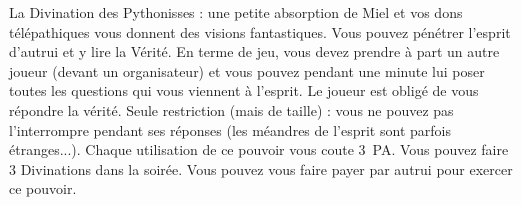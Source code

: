 \documentclass[14pt,twocolumn]{extarticle}
\begin{document}
La Divination des Pythonisses : une petite absorption de Miel et vos dons
télépathiques vous donnent des visions fantastiques. Vous pouvez pénétrer
l'esprit d'autrui et y lire la Vérité. En terme de jeu, vous devez prendre à
part un autre joueur (devant un organisateur) et vous pouvez pendant une minute
lui poser toutes les questions qui vous viennent à l'esprit. Le joueur est
obligé de vous répondre la vérité. Seule restriction (mais de taille) : vous ne
pouvez pas l'interrompre pendant ses réponses (les méandres de l'esprit sont
parfois étranges...). Chaque utilisation de ce pouvoir vous coute 3~PA. Vous
pouvez faire 3 Divinations dans la soirée. Vous pouvez vous faire payer par
autrui pour exercer ce pouvoir.
\end{document}

